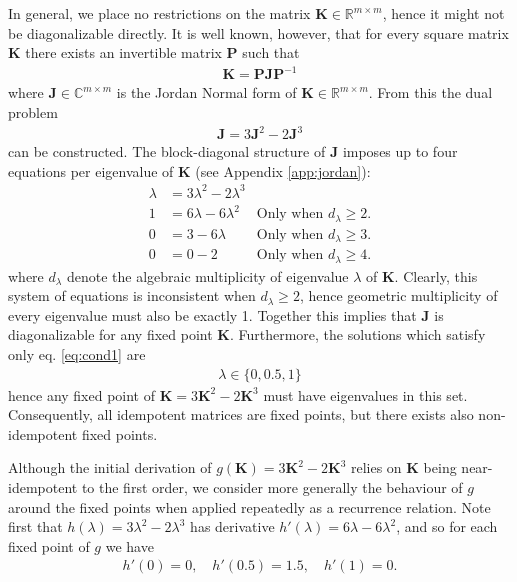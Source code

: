 \documentclass{article}
\theoremstyle{plain}
\theoremstyle{definition}
\theoremstyle{remark}
\newcommand{\vJ}{\mathbf{J}}
\newcommand{\vK}{\mathbf{K}}
\newcommand{\vP}{\mathbf{P}}
\begin{document}
In general, we place no restrictions on the matrix $\vK \in \mathbb{R}^{m \times m}$, hence it might not be diagonalizable directly. It is well known, however, that for every square matrix $\vK$ there exists an invertible matrix $\vP$ such that
\begin{align*}
    \vK = \vP \vJ \vP^{-1}
\end{align*}
where $\vJ \in \mathbb{C}^{m \times m}$ is the Jordan Normal form \cite{jordan-form} of $\vK \in \mathbb{R}^{m \times m}$. From this the dual problem
\begin{align*}
    \vJ = 3 \vJ^2 - 2 \vJ^3
\end{align*}
can be constructed. The block-diagonal structure of $\vJ$ imposes up to four equations per eigenvalue of $\vK$ (see Appendix \ref{app:jordan}):
\begin{align}
    \lambda & = 3\lambda^2 - 2\lambda^3 & \label{eq:cond1}                                   \\
    1       & = 6\lambda - 6\lambda^2   & \text{Only when $d_\lambda\geq2$.}\label{eq:cond2} \\
    0       & = 3 - 6\lambda            & \text{Only when $d_\lambda\geq3$.}\label{eq:cond3} \\
    0       & = 0 - 2                   & \text{Only when $d_\lambda\geq4$.}\label{eq:cond4}
\end{align}
where $d_\lambda$ denote the algebraic multiplicity of eigenvalue $\lambda$ of $\vK$. Clearly, this system of equations is inconsistent when $d_{\lambda} \geq 2$, hence geometric multiplicity of every eigenvalue must also be exactly 1. Together this implies that $\vJ$ is diagonalizable for any fixed point $\vK$. Furthermore, the solutions which satisfy only eq. \ref{eq:cond1} are
\begin{align*}
    \lambda \in \{0, 0.5, 1\}
\end{align*}
hence any fixed point of $\vK = 3 \vK^2 - 2 \vK^3$ must have eigenvalues in this set. Consequently, all idempotent matrices are fixed points, but there exists also non-idempotent fixed points.

Although the initial derivation of $g(\vK) = 3 \vK^2 - 2 \vK^3$ relies on $\vK$ being near-idempotent to the first order, we consider more generally the behaviour of $g$ around the fixed points when applied repeatedly as a recurrence relation. Note first that $h(\lambda) = 3\lambda^2 - 2\lambda^3$ has derivative $h'(\lambda) = 6\lambda - 6\lambda^2$, and so for each fixed point of $g$ we have
\begin{align*}
    h'(0) = 0, \quad h'(0.5) = 1.5, \quad h'(1) = 0.
\end{align*}
\end{document}
